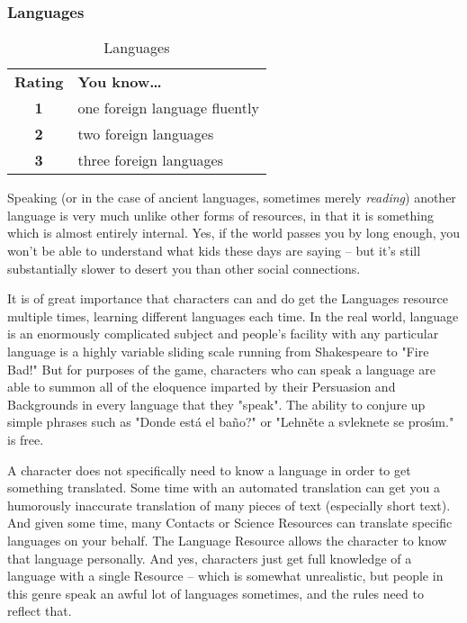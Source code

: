 \subsubsection{Languages}

\begin{wraptable}{R}{6.5cm}\vspace{-.5cm}
 \caption{Languages} \centering
\begin{tabular}{c l}
\textbf{Rating} & \textbf{You know\ldots{}}\\
\textbf{1}  &  one foreign language fluently\\
\textbf{2}  &  two foreign languages\\
\textbf{3}  &  three foreign languages\\
\end{tabular}
\end{wraptable}

\hspace{\parindent} Speaking (or in the case of ancient languages, sometimes merely \textit{reading}) another language is very much unlike other forms of resources, in that it is something which is almost entirely internal. Yes, if the world passes you by long enough, you won't be able to understand what kids these days are saying -- but it's still substantially slower to desert you than other social connections.

It is of great importance that characters can and do get the Languages resource multiple times, learning different languages each time. In the real world, language is an enormously complicated subject and people's facility with any particular language is a highly variable sliding scale running from Shakespeare to "Fire Bad!" But for purposes of the game, characters who can speak a language are able to summon all of the eloquence imparted by their Persuasion and Backgrounds in every language that they "speak". The ability to conjure up simple phrases such as "\textquestiondown{}Donde est\'{a} el ba\~{n}o?" or "Lehn\v{e}te a svleknete se pros\'{\i}m." is free.

A character does not specifically need to know a language in order to get something translated. Some time with an automated translation can get you a humorously inaccurate translation of many pieces of text (especially short text). And given some time, many Contacts or Science Resources can translate specific languages on your behalf. The Language Resource allows the character to know that language personally. And yes, characters just get full knowledge of a language with a single Resource -- which is somewhat unrealistic, but people in this genre speak an awful lot of languages sometimes, and the rules need to reflect that.


